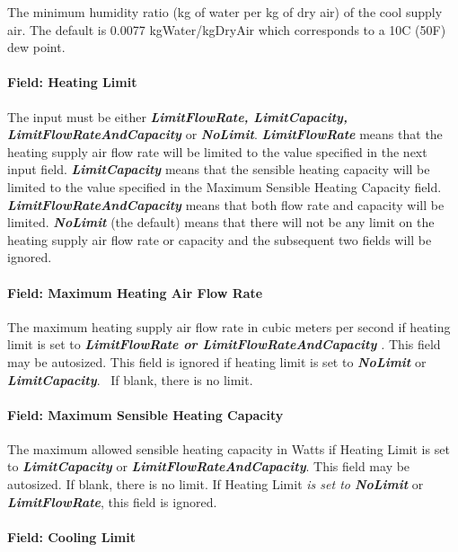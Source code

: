 The minimum humidity ratio (kg of water per kg of dry air) of the cool supply air. The default is 0.0077 kgWater/kgDryAir which corresponds to a 10C (50F) dew point.

\paragraph{Field: Heating Limit}\label{field-heating-limit-000}

The input must be either \textbf{\emph{LimitFlowRate, LimitCapacity, LimitFlowRateAndCapacity}} or \textbf{\emph{NoLimit}}. \textbf{\emph{LimitFlowRate}} means that the heating supply air flow rate will be limited to the value specified in the next input field. \textbf{\emph{LimitCapacity}} means that the sensible heating capacity will be limited to the value specified in the Maximum Sensible Heating Capacity field. \textbf{\emph{LimitFlowRateAndCapacity}} means that both flow rate and capacity will be limited. \textbf{\emph{NoLimit}} (the default) means that there will not be any limit on the heating supply air flow rate or capacity and the subsequent two fields will be ignored.

\paragraph{Field: Maximum Heating Air Flow Rate}\label{field-maximum-heating-air-flow-rate-001}

The maximum heating supply air flow rate in cubic meters per second if heating limit is set to \textbf{\emph{LimitFlowRate or LimitFlowRateAndCapacity}} \emph{.} This field may be autosized. This field is ignored if heating limit is set to \textbf{\emph{NoLimit}} or \textbf{\emph{LimitCapacity}}.~ If blank, there is no limit.

\paragraph{Field: Maximum Sensible Heating Capacity}\label{field-maximum-sensible-heating-capacity-000}

The maximum allowed sensible heating capacity in Watts if Heating Limit is set to \textbf{\emph{LimitCapacity}} or \textbf{\emph{LimitFlowRateAndCapacity}}. This field may be autosized. If blank, there is no limit. If Heating Limit \emph{is set to \textbf{NoLimit}} or \textbf{\emph{LimitFlowRate}}, this field is ignored.

\paragraph{Field: Cooling Limit}\label{field-cooling-limit-000}

